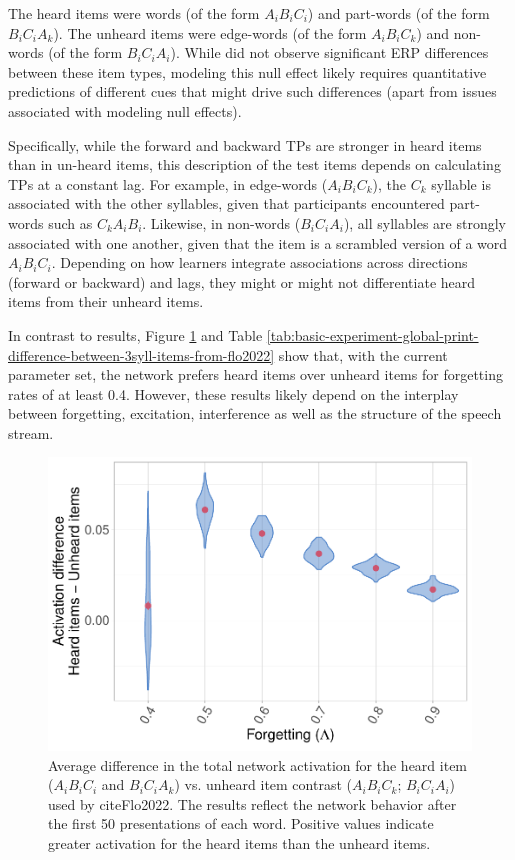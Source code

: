 \documentclass[
]{article}
\begin{document}
The heard items were words (of the form \(A_iB_iC_i\)) and part-words
(of the form \(B_iC_iA_k\)). The unheard items were edge-words (of the
form \(A_iB_iC_k\)) and non-words (of the form \(B_iC_iA_i\)). While
\citep{Flo2022} did not observe significant ERP differences between
these item types, modeling this null effect likely requires quantitative
predictions of different cues that might drive such differences (apart
from issues associated with modeling null effects).

Specifically, while the forward and backward TPs are stronger in heard
items than in un-heard items, this description of the test items depends
on calculating TPs at a constant lag. For example, in edge-words
(\(A_iB_iC_k\)), the \(C_k\) syllable is associated with the other
syllables, given that participants encountered part-words such as
\(C_kA_iB_i\). Likewise, in non-words (\(B_iC_iA_i\)), all syllables are
strongly associated with one another, given that the item is a scrambled
version of a word \(A_iB_iC_i\). Depending on how learners integrate
associations across directions (forward or backward) and lags, they
might or might not differentiate \citep{Flo2022} heard items from their
unheard items.

In contrast to \citep{Flo2022} results, Figure
\ref{fig:basic-experiment-global-print-act-3syll-flo2022-plot} and Table
\ref{tab:basic-experiment-global-print-difference-between-3syll-items-from-flo2022}
show that, with the current parameter set, the network prefers heard
items over unheard items for forgetting rates of at least 0.4. However,
these results likely depend on the interplay between forgetting,
excitation, interference as well as the structure of the speech stream.

\begin{figure}
\includegraphics[width=1\linewidth]{tp_model_entrainment_files/figure-latex/basic-experiment-global-print-act-3syll-flo2022-plot-1} \caption{Average difference in the total network activation for the heard item ($A_iB_iC_i$ and $B_iC_iA_k$) vs. unheard item contrast ($A_iB_iC_k$; $B_iC_iA_i$) used by cite{Flo2022}. The results reflect the network behavior after the first 50 presentations of each word. Positive values indicate greater activation for the heard items than the unheard items.}\label{fig:basic-experiment-global-print-act-3syll-flo2022-plot}
\end{figure}
\end{document}
